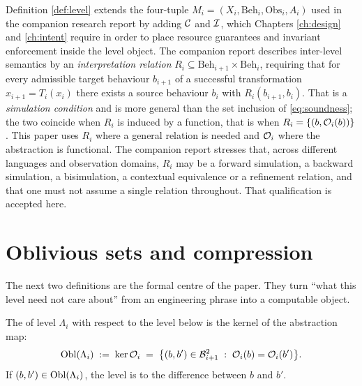 \begin{remark}\label{rmk:source}
Definition \ref{def:level} extends the four-tuple
$M_i = (X_i, \mathrm{Beh}_i, \mathrm{Obs}_i, A_i)$ used in the companion research report
by adding $\mathcal{C}$ and $\mathcal{I}$, which Chapters \ref{ch:design} and \ref{ch:intent} require in
order to place resource guarantees and invariant enforcement inside the level object. The
companion report describes inter-level semantics by an \emph{interpretation relation}
$R_i \subseteq \mathrm{Beh}_{i+1} \times \mathrm{Beh}_i$, requiring that for every
admissible target behaviour $b_{i+1}$ of a successful transformation
$x_{i+1} = T_i(x_i)$ there exists a source behaviour $b_i$ with $R_i(b_{i+1}, b_i)$. That
is a \emph{simulation condition} and is more general than the set inclusion of
\eqref{eq:soundness}; the two coincide when $R_i$ is induced by a function, that is when
$R_i = \{(b, \mathcal{O}_i(b))\}$. This paper uses $R_i$ where a general relation is needed and
$\mathcal{O}_i$ where the abstraction is functional. The companion report stresses that, across
different languages and observation domains, $R_i$ may be a forward simulation, a backward
simulation, a bisimulation, a contextual equivalence or a refinement relation, and that
one must not assume a single relation throughout. That qualification is accepted here.
\end{remark}

\section{Oblivious sets and compression}\label{sec:oblivious}

The next two definitions are the formal centre of the paper. They turn ``what this level
need not care about'' from an engineering phrase into a computable object.

\begin{definition}\label{def:oblivious}
The  of level $\Lambda_i$ with respect to the level below is the kernel
of the abstraction map:
\begin{equation}\label{eq:oblivious}
\operatorname{Obl}(\Lambda_i) \;:=\; \operatorname{ker} \mathcal{O}_i \;=\;
\bigl\{(b,b') \in \mathcal{B}_{i+1}^{2} \;:\; \mathcal{O}_i(b) = \mathcal{O}_i(b')\bigr\}.
\end{equation}
If $(b,b') \in \operatorname{Obl}(\Lambda_i)$, the level is  to the difference between
$b$ and $b'$.
\end{definition}

